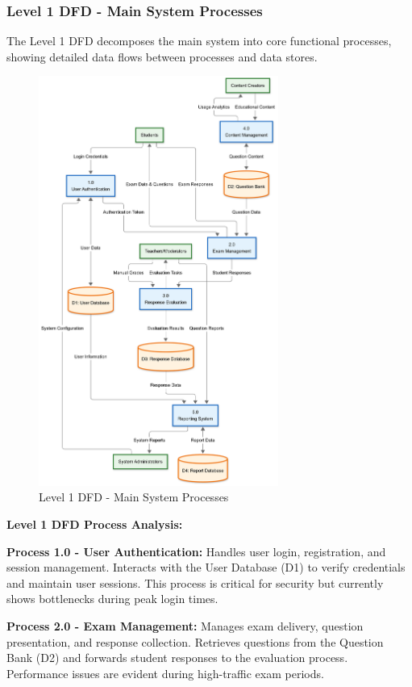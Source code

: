 \documentclass[12pt,a4paper,oneside]{book}
\begin{document}
\subsubsection{Level 1 DFD - Main System Processes}

The Level 1 DFD decomposes the main system into core functional processes, showing detailed data flows between processes and data stores.

\begin{figure}[H]
    \centering
    \includegraphics[width=0.7\textwidth]{Level1DFD.png}
    \caption{Level 1 DFD - Main System Processes}
\end{figure}

\textbf{Level 1 DFD Process Analysis:}

\textbf{Process 1.0 - User Authentication:} Handles user login, registration, and session management. Interacts with the User Database (D1) to verify credentials and maintain user sessions. This process is critical for security but currently shows bottlenecks during peak login times.

\vspace{0.3cm}
\textbf{Process 2.0 - Exam Management:} Manages exam delivery, question presentation, and response collection. Retrieves questions from the Question Bank (D2) and forwards student responses to the evaluation process. Performance issues are evident during high-traffic exam periods.
\end{document}
